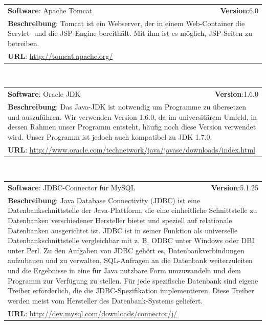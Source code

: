 \begin{tabular}{p{10cm}r}
\textbf{Software}: Apache Tomcat & \textbf{Version}:6.0\\
\multicolumn{2}{p{1\textwidth}}{\textbf{Beschreibung}: Tomcat ist ein Webserver, der in einem Web-Container die Servlet- und die JSP-Engine bereithält. Mit ihm ist es möglich, JSP-Seiten zu betreiben.}\\
\multicolumn{2}{l}{\textbf{URL}: \url{http://tomcat.apache.org/}}
\end{tabular}\\

\begin{tabular}{p{10cm}r}
\textbf{Software}: Oracle JDK  & \textbf{Version}:1.6.0\\
\multicolumn{2}{p{1\textwidth}}{\textbf{Beschreibung}: Das Java-JDK ist notwendig um Programme zu übersetzen und auszuführen. Wir verwenden Version 1.6.0, da im universitärem Umfeld, in dessen Rahmen unser Programm entsteht, häufig noch diese Version verwendet wird. Unser Programm ist jedoch auch kompatibel zu JDK 1.7.0.}\\
\multicolumn{2}{l}{\textbf{URL}: \url{http://www.oracle.com/technetwork/java/javase/downloads/index.html}}
\end{tabular}\\

\begin{tabular}{p{10cm}r}
\textbf{Software}: JDBC-Connector für MySQL  & \textbf{Version}:5.1.25\\
\multicolumn{2}{p{1\textwidth}}{\textbf{Beschreibung}: Java Database Connectivity (JDBC) ist eine Datenbankschnittstelle der Java-Plattform, die eine einheitliche Schnittstelle zu Datenbanken verschiedener Hersteller bietet und speziell auf relationale Datenbanken ausgerichtet ist. JDBC ist in seiner Funktion als universelle Datenbankschnittstelle vergleichbar mit z. B. ODBC unter Windows oder DBI unter Perl. Zu den Aufgaben von JDBC gehört es, Datenbankverbindungen aufzubauen und zu verwalten, SQL-Anfragen an die Datenbank weiterzuleiten und die Ergebnisse in eine für Java nutzbare Form umzuwandeln und dem Programm zur Verfügung zu stellen. Für jede spezifische Datenbank sind eigene Treiber erforderlich, die die JDBC-Spezifikation implementieren. Diese Treiber werden meist vom Hersteller des Datenbank-Systems geliefert.}\\
\multicolumn{2}{l}{\textbf{URL}: \url{http://dev.mysql.com/downloads/connector/j/}}
\end{tabular}\\

